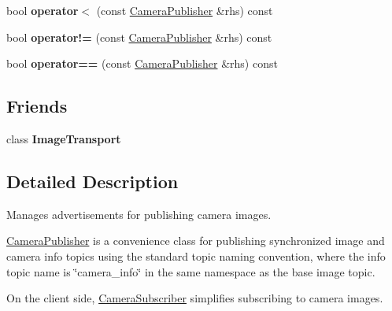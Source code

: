 \begin{DoxyCompactItemize}
\item 
\hypertarget{classimage__transport_1_1_camera_publisher_a136a72a44c74bcfa255482c47ece4a0e}{bool {\bfseries operator$<$} (const \hyperlink{classimage__transport_1_1_camera_publisher}{Camera\-Publisher} \&rhs) const }\label{classimage__transport_1_1_camera_publisher_a136a72a44c74bcfa255482c47ece4a0e}

\item 
\hypertarget{classimage__transport_1_1_camera_publisher_a2b156b3a3986144d55389d0c3781c761}{bool {\bfseries operator!=} (const \hyperlink{classimage__transport_1_1_camera_publisher}{Camera\-Publisher} \&rhs) const }\label{classimage__transport_1_1_camera_publisher_a2b156b3a3986144d55389d0c3781c761}

\item 
\hypertarget{classimage__transport_1_1_camera_publisher_ad7c4b4e03ba25e3ab2ae5d15f7ac4d7c}{bool {\bfseries operator==} (const \hyperlink{classimage__transport_1_1_camera_publisher}{Camera\-Publisher} \&rhs) const }\label{classimage__transport_1_1_camera_publisher_ad7c4b4e03ba25e3ab2ae5d15f7ac4d7c}

\end{DoxyCompactItemize}
\subsection*{Friends}
\begin{DoxyCompactItemize}
\item 
\hypertarget{classimage__transport_1_1_camera_publisher_ac010f5a40d98825199e1c5303d0638eb}{class {\bfseries Image\-Transport}}\label{classimage__transport_1_1_camera_publisher_ac010f5a40d98825199e1c5303d0638eb}

\end{DoxyCompactItemize}


\subsection{Detailed Description}
Manages advertisements for publishing camera images. 

\hyperlink{classimage__transport_1_1_camera_publisher}{Camera\-Publisher} is a convenience class for publishing synchronized image and camera info topics using the standard topic naming convention, where the info topic name is \char`\"{}camera\-\_\-info\char`\"{} in the same namespace as the base image topic.

On the client side, \hyperlink{classimage__transport_1_1_camera_subscriber}{Camera\-Subscriber} simplifies subscribing to camera images.

